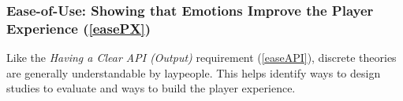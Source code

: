 \begin{table}[!tb]
\begin{center}
\begin{threeparttable}
\begin{tablenotes}
                \vspace*{-7mm}
            \end{tablenotes}
        \end{threeparttable}%
    \end{center}
\end{table}

\subsubsection{Ease-of-Use: Showing that Emotions Improve the Player Experience
    (\ref{easePX})}
Like the \textit{Having a Clear API (Output)} requirement  (\ref{easeAPI}),
discrete theories are generally understandable by laypeople. This helps
identify ways to design studies to evaluate and ways to build the player
experience.


